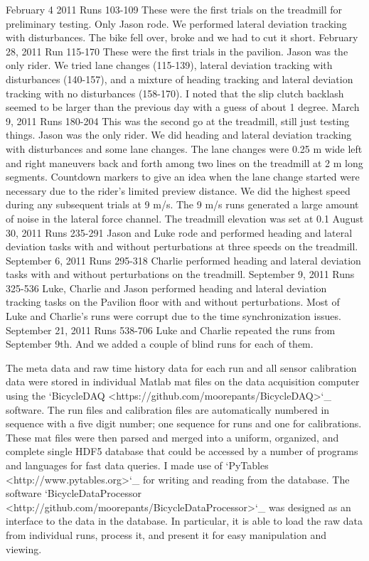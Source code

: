 \documentclass{article}
\begin{document}
February 4 2011 Runs 103-109
   These were the first trials on the treadmill for preliminary testing. Only
   Jason rode. We performed lateral deviation tracking with disturbances. The
   bike fell over, broke and we had to cut it short.
February 28, 2011 Run 115-170
   These were the first trials in the pavilion. Jason was the only rider. We
   tried lane changes (115-139), lateral deviation tracking with disturbances
   (140-157), and a mixture of heading tracking and lateral deviation tracking
   with no disturbances (158-170). I noted that the slip clutch backlash seemed
   to be larger than the previous day with a guess of about 1 degree.
March 9, 2011 Runs 180-204
   This was the second go at the treadmill, still just testing things. Jason
   was the only rider. We did heading and lateral deviation tracking with
   disturbances and some lane changes. The lane changes were 0.25 m wide left
   and right maneuvers back and forth among two lines on the treadmill at 2 m
   long segments. Countdown markers to give an idea when the lane change
   started were necessary due to the rider's limited preview distance. We did
   the highest speed during any subsequent trials at 9 m/s. The 9 m/s runs
   generated a large amount of noise in the lateral force channel. The treadmill
   elevation was set at 0.1%
August 30, 2011 Runs 235-291
   Jason and Luke rode and performed heading and lateral deviation tasks with
   and without perturbations at three speeds on the treadmill.
September 6, 2011 Runs 295-318
   Charlie performed heading and lateral deviation tasks with and without
   perturbations on the treadmill.
September 9, 2011 Runs 325-536
   Luke, Charlie and Jason performed heading and lateral deviation tracking
   tasks on the Pavilion floor with and without perturbations. Most of Luke and
   Charlie's runs were corrupt due to the time synchronization issues.
September 21, 2011 Runs 538-706
   Luke and Charlie repeated the runs from September 9th. And we added a couple
   of blind runs for each of them.

The meta data and raw time history data for each run and all sensor calibration
data were stored in individual Matlab mat files on the data acquisition
computer using the `BicycleDAQ <https://github.com/moorepants/BicycleDAQ>`_
software. The run files and calibration files are automatically numbered in
sequence with a five digit number; one sequence for runs and one for
calibrations. These mat files were then parsed and merged into a uniform,
organized, and complete single HDF5 database that could be accessed by a number
of programs and languages for fast data queries. I made use of `PyTables
<http://www.pytables.org>`_ for writing and reading from the database. The
software `BicycleDataProcessor
<http://github.com/moorepants/BicycleDataProcessor>`_ was designed as an
interface to the data in the database. In particular, it is able to load the
raw data from individual runs, process it, and present it for easy manipulation
and viewing.
\end{document}
